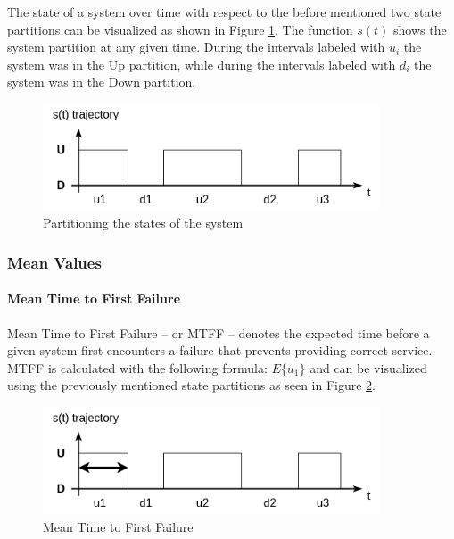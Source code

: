 The state of a system over time with respect to the before mentioned two state partitions can be visualized as shown in Figure \ref{fig:system_state_partitions}. The function \(s(t)\) shows the system partition at any given time. During the intervals labeled with \(u_i\) the system was in the Up partition, while during the intervals labeled with \(d_i\) the system was in the Down partition.


\begin{figure}[h]
	\centering
	\includegraphics[width=100mm, keepaspectratio]{figures/system_state_partitions.png}
	\caption{ Partitioning the states of the system \cite{DependabilityBMEMIT} }
	\label{fig:system_state_partitions}
\end{figure}

\subsubsection{Mean Values} \label{background-dep-metrics-mean-values}

\paragraph{Mean Time to First Failure} Mean Time to First Failure -- or MTFF -- denotes the expected time before a given system first encounters a failure that prevents providing correct service. MTFF is calculated with the following formula: \(E\{u_1\}\) and can be visualized using the previously mentioned state partitions as seen in Figure \ref{fig:mtff}.

\begin{figure}[h]
	\centering
	\includegraphics[width=100mm, keepaspectratio]{figures/MTFF.png}
	\caption{ Mean Time to First Failure \cite{DependabilityBMEMIT} }
	\label{fig:mtff}
\end{figure}

